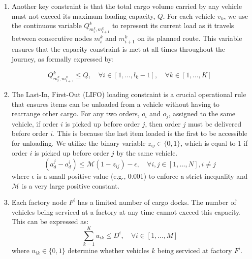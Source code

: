 \documentclass[preprint,12pt]{elsarticle}
\begin{document}
\begin{enumerate}
\begin{equation}
    \text{demand}(o^i) = q^i_{\text{standard}} + \frac{1}{2} q^i_{\text{small}} + \frac{1}{4} q^i_{\text{boxes}}
\end{equation}

\begin{equation}
     \text{demand}(o^i) = \sum_{h = 1}^{ \mathcal{H} ^i} \text{demand}(o^i_h)
\end{equation}

\begin{equation}
     0 < \text{demand}(o^i_h) \leq Q , \quad \forall h\in [1 , \dots , \mathcal{H}^i] , \quad \forall i \in [1, \dots , N] 
\end{equation}


    \item Another key constraint is that the total cargo volume carried by any vehicle must not exceed its maximum loading capacity, $Q$. For each vehicle $v_k$, we use the continuous variable $Q^k_{m_i^k , m_{i+1}^k}$ to represent its current load as it travels between consecutive nodes $m_i^k$ and $m_{i+1}^k$ on its planned route. This variable ensures that the capacity constraint is met at all times throughout the journey, as formally expressed by:

\begin{equation}
    Q^k_{m_i^k , m_{i +1}^k} \leq Q , \quad \forall i \in [1 , \dots , l_k - 1] , \quad \forall k \in [1, \dots , K]
\end{equation}

    \item The Last-In, First-Out (LIFO) loading constraint is a crucial operational rule that ensures items can be unloaded from a vehicle without having to rearrange other cargo. For any two orders, $o_i$ and $o_j$, assigned to the same vehicle, if order $i$ is picked up before order $j$, then order $j$ must be delivered before order $i$. This is because the last item loaded is the first to be accessible for unloading. We utilize the binary variable $z_{ij} \in \{0,1\}$, which is equal to 1 if order $i$ is picked up before order $j$ by the same vehicle. 
\begin{equation}
  (a_{d}^j - a_{d}^i) \leq \mathcal{M}(1 - z_{ij}) - \epsilon, \quad \forall i, j \in [1 , \dots , N], i \neq j   
\end{equation}
where $\epsilon$ is a small positive value (e.g., 0.001) to enforce a strict inequality and $\mathcal{M}$ is a very large positive constant.

    \item Each factory node $F^i$ has a limited number of cargo docks. The number of vehicles being serviced at a factory at any time cannot exceed this capacity. This can be expressed as:
\begin{equation}
    \sum_{k = 1}^K u_{i k} \leq D^i, \quad \forall i \in [1 , \dots , M]
\end{equation}
where $ u_{i k} \in \{0 , 1\}$ determine whether vehicles $k$ being serviced at factory $F^i$.


\end{enumerate}
\end{document}
